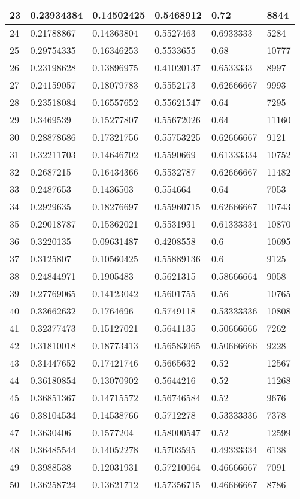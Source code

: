 \begin{longtable}{|l|l|l|l|l|l|}
23 & 0.23934384 & 0.14502425 & 0.5468912 & 0.72 & 8844 \\ \hline 
24 & 0.21788867 & 0.14363804 & 0.5527463 & 0.6933333 & 5284 \\ \hline 
25 & 0.29754335 & 0.16346253 & 0.5533655 & 0.68 & 10777 \\ \hline 
26 & 0.23198628 & 0.13896975 & 0.41020137 & 0.6533333 & 8997 \\ \hline 
27 & 0.24159057 & 0.18079783 & 0.5552173 & 0.62666667 & 9993 \\ \hline 
28 & 0.23518084 & 0.16557652 & 0.55621547 & 0.64 & 7295 \\ \hline 
29 & 0.3469539 & 0.15277807 & 0.55672026 & 0.64 & 11160 \\ \hline 
30 & 0.28878686 & 0.17321756 & 0.55753225 & 0.62666667 & 9121 \\ \hline 
31 & 0.32211703 & 0.14646702 & 0.5590669 & 0.61333334 & 10752 \\ \hline 
32 & 0.2687215 & 0.16434366 & 0.5532787 & 0.62666667 & 11482 \\ \hline 
33 & 0.2487653 & 0.1436503 & 0.554664 & 0.64 & 7053 \\ \hline 
34 & 0.2929635 & 0.18276697 & 0.55960715 & 0.62666667 & 10743 \\ \hline 
35 & 0.29018787 & 0.15362021 & 0.5531931 & 0.61333334 & 10870 \\ \hline 
36 & 0.3220135 & 0.09631487 & 0.4208558 & 0.6 & 10695 \\ \hline 
37 & 0.3125807 & 0.10560425 & 0.55889136 & 0.6 & 9125 \\ \hline 
38 & 0.24844971 & 0.1905483 & 0.5621315 & 0.58666664 & 9058 \\ \hline 
39 & 0.27769065 & 0.14123042 & 0.5601755 & 0.56 & 10765 \\ \hline 
40 & 0.33662632 & 0.1764696 & 0.5749118 & 0.53333336 & 10808 \\ \hline 
41 & 0.32377473 & 0.15127021 & 0.5641135 & 0.50666666 & 7262 \\ \hline 
42 & 0.31810018 & 0.18773413 & 0.56583065 & 0.50666666 & 9228 \\ \hline 
43 & 0.31447652 & 0.17421746 & 0.5665632 & 0.52 & 12567 \\ \hline 
44 & 0.36180854 & 0.13070902 & 0.5644216 & 0.52 & 11268 \\ \hline 
45 & 0.36851367 & 0.14715572 & 0.56746584 & 0.52 & 9676 \\ \hline 
46 & 0.38104534 & 0.14538766 & 0.5712278 & 0.53333336 & 7378 \\ \hline 
47 & 0.3630406 & 0.1577204 & 0.58000547 & 0.52 & 12599 \\ \hline 
48 & 0.36485544 & 0.14052278 & 0.5703595 & 0.49333334 & 6138 \\ \hline 
49 & 0.3988538 & 0.12031931 & 0.57210064 & 0.46666667 & 7091 \\ \hline 
50 & 0.36258724 & 0.13621712 & 0.57356715 & 0.46666667 & 8786 \\ \hline 
\end{longtable}